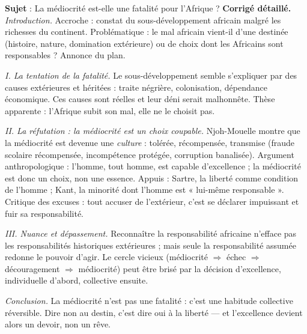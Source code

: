 \documentclass[11pt]{article}
\begin{document}
\begin{exoresolu}
\textbf{Sujet} : La médiocrité est-elle une fatalité pour l'Afrique ?
\tcblower
\textbf{Corrigé détaillé.} \emph{Introduction.} Accroche : constat du sous-développement africain malgré les richesses du continent. Problématique : le mal africain vient-il d'une destinée (histoire, nature, domination extérieure) ou de choix dont les Africains sont responsables ? Annonce du plan. \par
\emph{I. La tentation de la fatalité.} Le sous-développement semble s'expliquer par des causes extérieures et héritées : traite négrière, colonisation, dépendance économique. Ces causes sont réelles et leur déni serait malhonnête. Thèse apparente : l'Afrique subit son mal, elle ne le choisit pas. \par
\emph{II. La réfutation : la médiocrité est un choix coupable.} Njoh-Mouelle montre que la médiocrité est devenue une \emph{culture} : tolérée, récompensée, transmise (fraude scolaire récompensée, incompétence protégée, corruption banalisée). Argument anthropologique : l'homme, tout homme, est capable d'excellence ; la médiocrité est donc un choix, non une essence. Appuis : Sartre, la liberté comme condition de l'homme ; Kant, la minorité dont l'homme est « lui-même responsable ». Critique des excuses : tout accuser de l'extérieur, c'est se déclarer impuissant et fuir sa responsabilité. \par
\emph{III. Nuance et dépassement.} Reconnaître la responsabilité africaine n'efface pas les responsabilités historiques extérieures ; mais seule la responsabilité assumée redonne le pouvoir d'agir. Le cercle vicieux (médiocrité $\Rightarrow$ échec $\Rightarrow$ découragement $\Rightarrow$ médiocrité) peut être brisé par la décision d'excellence, individuelle d'abord, collective ensuite. \par
\emph{Conclusion.} La médiocrité n'est pas une fatalité : c'est une habitude collective réversible. Dire non au destin, c'est dire oui à la liberté — et l'excellence devient alors un devoir, non un rêve.
\end{exoresolu}
\end{document}
